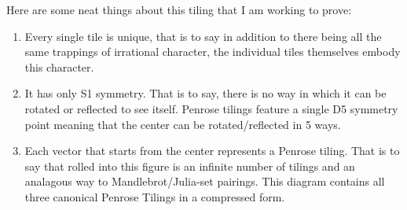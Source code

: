 \documentclass{amsart}
\begin{document}
Here are some neat things about this tiling that I am working to prove:
\begin{enumerate}
	\item Every single tile is unique, that is to say in addition to there being all the same trappings of irrational character, the individual tiles themselves embody this character.
	\item It has only S1 symmetry. That is to say, there is no way in which it can be rotated or reflected to see itself. Penrose tilings feature a single D5 symmetry point meaning that the center can be rotated/reflected in 5 ways.
	\item Each vector that starts from the center represents a Penrose tiling. That is to say that rolled into this figure is an infinite number of tilings and an analagous way to Mandlebrot/Julia-set pairings. This diagram contains all three canonical Penrose Tilings in a compressed form.
\end{enumerate}


\end{document}
